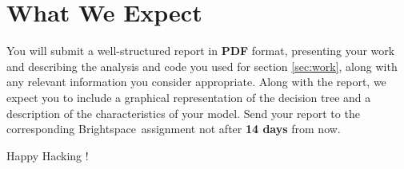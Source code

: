 \documentclass{article}
\begin{document}
\section{What We Expect}
You will submit a well-structured report in \textbf{PDF} format, presenting your work and describing the analysis and code you used for section \ref{sec:work}, along with any relevant information you consider appropriate. Along with the report, we expect you to include a graphical representation of the decision tree and a description of the characteristics of your model. Send your report to the corresponding Brightspace\texttrademark ~assignment not after \textbf{14 days} from now.

\vspace{5mm}
Happy Hacking !
\end{document}
